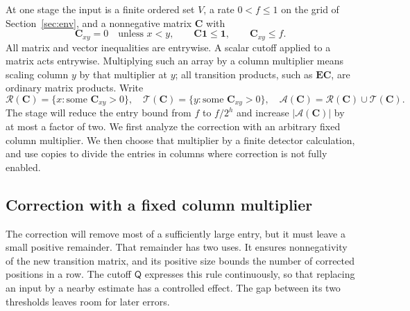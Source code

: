 \documentclass[11pt]{article}
\numberwithin{equation}{section}
\theoremstyle{definition}
\theoremstyle{remark}
\begin{document}
At one stage the input is a finite ordered set $V$, a rate $0<f\le1$
on the grid of Section~\ref{sec:env}, and a nonnegative matrix ${\mathbf{C}}$ with
\begin{equation}
 {\mathbf{C}}_{xy}=0\quad\text{unless }x<y,\qquad
 {\mathbf{C}}\mathbf1\le\mathbf1,\qquad {\mathbf{C}}_{xy}\le f.
 \label{eq:hier-input}
\end{equation}
All matrix and vector inequalities are entrywise. A scalar cutoff applied to a matrix acts entrywise. Multiplying such an array by a column multiplier means scaling column $y$ by that multiplier at $y$; all transition products, such as $\mathbf E\mathbf C$, are ordinary matrix products. Write
\[
 \mathcal R({\mathbf{C}})=\{x:\text{some }{\mathbf{C}}_{xy}>0\},\quad
 \mathcal T({\mathbf{C}})=\{y:\text{some }{\mathbf{C}}_{xy}>0\},\quad
 \mathcal A({\mathbf{C}})=\mathcal R({\mathbf{C}})\cup\mathcal T({\mathbf{C}}).
\]
The stage will reduce the entry bound from $f$ to $f/2^{h}$ and increase
$|\mathcal A({\mathbf{C}})|$ by at most a factor of two. We first analyze the
correction with an arbitrary fixed column multiplier. We then choose that
multiplier by a finite detector calculation, and use copies to divide the
entries in columns where correction is not fully enabled.

\subsection{Correction with a fixed column multiplier}

The correction will remove most of a sufficiently large entry, but it must leave a small positive remainder. That remainder has two uses. It ensures nonnegativity of the new transition matrix, and its positive size bounds the number of corrected positions in a row. The cutoff ${\mathsf{Q}}$ expresses this rule continuously, so that replacing an input by a nearby estimate has a controlled effect. The gap between its two thresholds leaves room for later errors.
\end{document}
